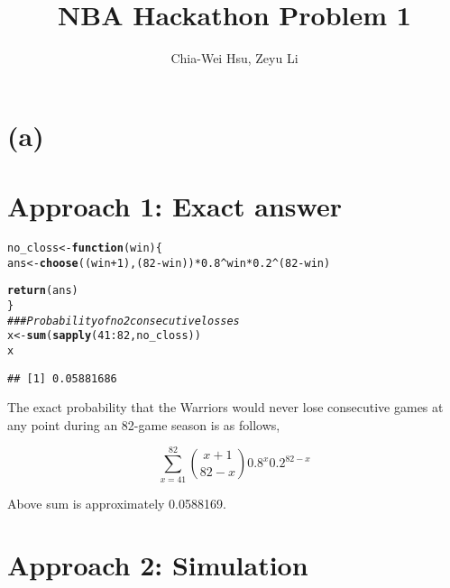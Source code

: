 \documentclass{article}\usepackage[]{graphicx}\usepackage[]{color}
\makeatletter
\newcommand{\hlnum}[1]{\textcolor[rgb]{0.686,0.059,0.569}{#1}}%
\newcommand{\hlcom}[1]{\textcolor[rgb]{0.678,0.584,0.686}{\textit{#1}}}%
\newcommand{\hlopt}[1]{\textcolor[rgb]{0,0,0}{#1}}%
\newcommand{\hlstd}[1]{\textcolor[rgb]{0.345,0.345,0.345}{#1}}%
\newcommand{\hlkwa}[1]{\textcolor[rgb]{0.161,0.373,0.58}{\textbf{#1}}}%
\newcommand{\hlkwb}[1]{\textcolor[rgb]{0.69,0.353,0.396}{#1}}%
\newcommand{\hlkwc}[1]{\textcolor[rgb]{0.333,0.667,0.333}{#1}}%
\newcommand{\hlkwd}[1]{\textcolor[rgb]{0.737,0.353,0.396}{\textbf{#1}}}%
\newenvironment{kframe}{%
 \def\at@end@of@kframe{}%
 \ifinner\ifhmode%
  \def\at@end@of@kframe{\end{minipage}}%
  \begin{minipage}{\columnwidth}%
 \fi\fi%
 \def\FrameCommand##1{\hskip\@totalleftmargin \hskip-\fboxsep
 \colorbox{shadecolor}{##1}\hskip-\fboxsep
     \hskip-\linewidth \hskip-\@totalleftmargin \hskip\columnwidth}%
 \MakeFramed {\advance\hsize-\width
   \@totalleftmargin\z@ \linewidth\hsize
   \@setminipage}}%
 {\par\unskip\endMakeFramed%
 \at@end@of@kframe}
\newenvironment{knitrout}{}{} %
\makeatother
\begin{document}
\title{NBA Hackathon Problem 1}
\author{Chia-Wei Hsu, Zeyu Li}
\maketitle

\section*{(a)}
\section*{Approach 1: Exact answer}
\begin{knitrout}
\color{fgcolor}\begin{kframe}
\begin{alltt}
\hlstd{no_closs} \hlkwb{<-} \hlkwa{function}\hlstd{(}\hlkwc{win}\hlstd{)\{}
  \hlstd{ans} \hlkwb{<-} \hlkwd{choose}\hlstd{((win} \hlopt{+} \hlnum{1}\hlstd{), (}\hlnum{82} \hlopt{-} \hlstd{win) )} \hlopt{*} \hlnum{0.8}\hlopt{^}\hlstd{win} \hlopt{*} \hlnum{0.2}\hlopt{^}\hlstd{(}\hlnum{82} \hlopt{-} \hlstd{win)}

  \hlkwd{return}\hlstd{(ans)}
\hlstd{\}}
\hlcom{### Probability of no 2 consecutive losses}
\hlstd{x} \hlkwb{<-} \hlkwd{sum}\hlstd{(}\hlkwd{sapply}\hlstd{(}\hlnum{41}\hlopt{:}\hlnum{82}\hlstd{, no_closs))}
\hlstd{x}
\end{alltt}
\begin{verbatim}
## [1] 0.05881686
\end{verbatim}
\end{kframe}
\end{knitrout}
    
The exact probability that the Warriors would never lose consecutive games at any
point during an 82-game season is as follows, 

\begin{equation*}
    \sum_{x = 41}^{82}\binom{x+1}{82-x}0.8^x0.2^{82-x}
\end{equation*}

Above sum is approximately 0.0588169.

\section*{Approach 2: Simulation}
\end{document}

